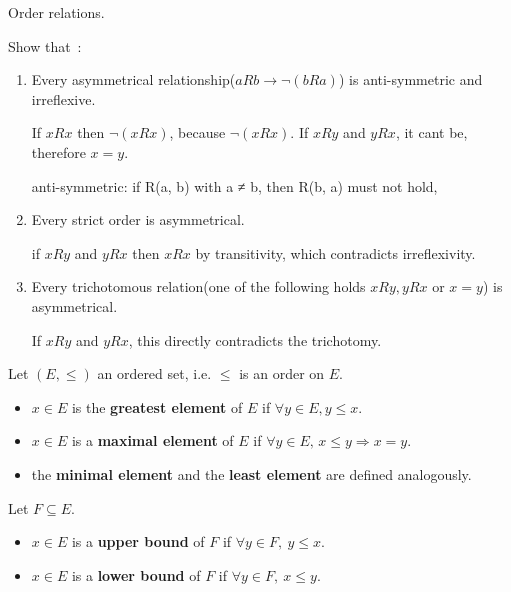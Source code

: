 \documentclass[a4paper,11pt]{exam}
\begin{document}
\begin{questions}
  \bigskip
  \colorbox{gris}{
    \begin{minipage}[c]{15cm}
      Order relations.
    \end{minipage}
  }

  \question
  Show that~:
  \begin{enumerate}
    \item Every asymmetrical relationship($aRb \rightarrow \neg(bRa)$) is anti-symmetric and irreflexive.

      \begin{solution}
        If $xRx$ then $\neg(xRx)$, because $\neg(xRx)$. If $xRy$ and $yRx$, it cant be, therefore $x = y$.
        
        anti-symmetric: if R(a, b) with a ≠ b, then R(b, a) must not hold,
      \end{solution}

    \item Every strict order is asymmetrical.

      \begin{solution}
        if $xRy$ and $yRx$ then $xRx$ by transitivity, which contradicts irreflexivity.
      \end{solution}

    \item Every trichotomous relation(one of the following holds $xRy, yRx$ or $x=y$) is asymmetrical.

      \begin{solution}
        If $xRy$ and $yRx$, this directly contradicts the trichotomy.
      \end{solution}
%
%
  \end{enumerate}

  \bigskip
  Let $(E,\leq)$ an ordered set, i.e. $\leq$ is an order on $E$.
  \begin{itemize}
    \item $x \in E$ is the \textbf{greatest element} of $E$ if
      $\forall y \in E, y \leq x$.
    \item $x \in E$ is a \textbf{maximal element} of $E$ if
      $\forall y \in E,\,x \leq y\Rightarrow x = y$.
    \item the \textbf{minimal element} and the  \textbf{least element} are defined analogously.
  \end{itemize} 
Let $F \subseteq E$.
  \begin{itemize}
    \item $x \in E$ is a \textbf{upper bound} of $F$ if
      $\forall y \in F,~y \leq x$.
    \item $x \in E$ is a \textbf{lower bound} of $F$ if
      $\forall y \in F,~x \leq y$.
  \end{itemize}


\end{questions}
\end{document}
